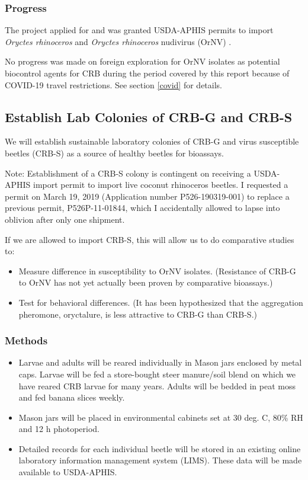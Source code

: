 \documentclass[12pt,letterpaper,english,bibliography=totocnumbered,abstract=on]{scrartcl}
\begin{document}
\subsubsection{Progress}

The project applied for and was granted USDA-APHIS permits to import \textit{Oryctes rhinoceros} \cite{usda-aphis_crb_2019} and \textit{Oryctes rhinoceros} nudivirus (OrNV) \cite{usda-aphisImportPermitOrNV2020}.

No progress was made on foreign exploration for OrNV isolates as potential biocontrol agents for CRB during the period covered by this report because of COVID-19 travel restrictions. See section \ref{covid} for details.

\newpage
\begin{framed}
\subsection{Establish Lab Colonies of CRB-G and CRB-S}

We will establish sustainable laboratory colonies of CRB-G and virus susceptible beetles (CRB-S) as a source of healthy beetles for bioassays.

Note: Establishment of a CRB-S colony is contingent on receiving a USDA-APHIS import permit to import live coconut rhinoceros beetles. I requested a permit on March 19, 2019 (Application number P526-190319-001) to replace a previous permit, P526P-11-01844, which I accidentally allowed to lapse into oblivion after only one shipment.

If we are allowed to import CRB-S, this will allow us to do comparative studies to:

\begin{itemize}
\item Measure difference in susceptibility to OrNV isolates. (Resistance of CRB-G to OrNV has not yet actually been proven by comparative bioassays.)
\item Test for behavioral differences. (It has been hypothesized that the aggregation pheromone, oryctalure, is less attractive to CRB-G than CRB-S.)
\end{itemize}

\subsubsection{Methods}

\begin{itemize}
	\item Larvae and adults will be reared individually in Mason jars enclosed by metal caps. Larvae will be fed a store-bought steer manure/soil blend on which we have reared CRB larvae for many years. Adults will be bedded in peat moss and fed banana slices weekly.
	\item Mason jars will be placed in environmental cabinets set at 30 deg. C, 80\% RH and 12 h photoperiod.
	\item Detailed records for each individual beetle will be stored in an existing online laboratory information management system (LIMS). These data will be made available to USDA-APHIS.
\end{itemize}
\end{framed}
\end{document}
